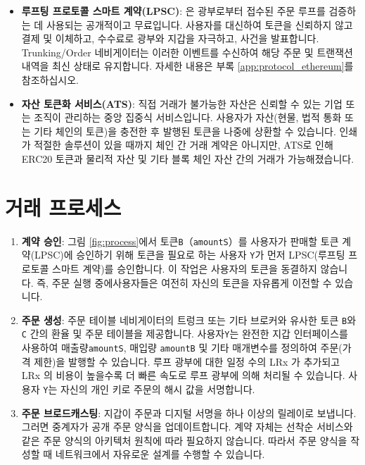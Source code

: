 \documentclass{article}
\begin{document}
\begin{multicols}{2}
\begin{itemize}
	\item \textbf{루프팅 프로토콜 스마트 계약(LPSC)}: 은 광부로부터 접수된 주문 루프를 검증하는 데 사용되는 공개적이고 무료입니다. 사용자를 대신하여 토큰을 신뢰하지 않고 결제 및 이체하고, 수수료로 광부와 지갑을 자극하고, 사건을 발표합니다. Trunking/Order 네비게이터는 이러한 이벤트를 수신하여 해당 주문 및 트랜잭션 내역을 최신 상태로 유지합니다. 자세한 내용은 부록 \ref{app:protocol_ethereum}를 참조하십시오.

	\item \textbf{자산 토큰화 서비스(ATS)}: 직접 거래가 불가능한 자산은 신뢰할 수 있는 기업 또는 조직이 관리하는 중앙 집중식 서비스입니다. 사용자가 자산(현물, 법적 통화 또는 기타 체인의 토큰)을 충전한 후 발행된 토큰을 나중에 상환할 수 있습니다. 인쇄가 적절한 솔루션이 있을 때까지 체인 간 거래 계약은 아니지만, ATS로 인해 ERC20 토큰\cite{ERC20}과 물리적 자산 및 기타 블록 체인 자산 간의 거래가 가능해졌습니다.

\end{itemize}


\section{거래 프로세스\label{sec:process}}


\begin{enumerate} 
	
	
	\item \textbf{계약 승인}: 그림 \ref{fig:process}에서 토큰\verb|B|（\verb|amountS|）를 사용자가 판매할 토큰 계약(LPSC)에 승인하기 위해 토큰을 필요로 하는 사용자 \verb|Y|가 먼저 LPSC(루프팅 프로토콜 스마트 계약)를 승인합니다. 이 작업은 사용자의 토큰을 동결하지 않습니다. 즉, 주문 실행 중에사용자들은 여전히 자신의 토큰을 자유롭게 이전할 수 있습니다.
	
	\item \textbf{주문 생성}: 주문 테이블 네비게이터의 트렁크 또는 기타 브로커와 유사한 토큰 \verb|B|와  \verb|C| 간의 환율 및 주문 테이블을 제공합니다. 사용자\verb|Y|는 완전한 지갑 인터페이스를 사용하여 매출량\verb|amountS|, 매입량 \verb|amountB| 및 기타 매개변수를 정의하여 주문(가격 제한)을 발행할 수 있습니다. 루프 광부에 대한 일정 수의 LRx 가 추가되고 LRx 의 비용이 높을수록 더 빠른 속도로 루프 광부에 의해 처리될 수 있습니다. 사용자 \verb|Y|는 자신의 개인 키로 주문의 해시 값을 서명합니다.
	
    \item \textbf{주문 브로드캐스팅}: 지갑이 주문과 디지털 서명을 하나 이상의 릴레이로 보냅니다. 그러면 중계자가 공개 주문 양식을 업데이트합니다. 계약 자체는 선착순 서비스와 같은 주문 양식의 아키텍처 원칙에 따라 필요하지 않습니다. 따라서 주문 양식을 작성할 때 네트워크에서 자유로운 설계를 수행할 수 있습니다.
    

\end{enumerate}
\end{multicols}
\end{document}
